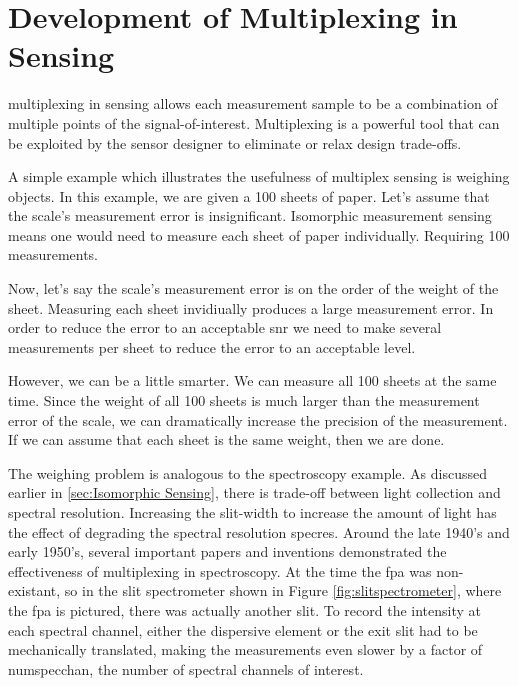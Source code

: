 \section{Development of Multiplexing in Sensing}

\Gls{multiplexing} in sensing allows each measurement sample to be a combination of multiple points of the signal-of-interest. Multiplexing is a powerful tool that can be exploited by the sensor designer to eliminate or relax design trade-offs. 

A simple example which illustrates the usefulness of multiplex sensing is weighing objects. In this example, we are given a 100 sheets of paper. Let's assume that the scale's measurement error is insignificant. Isomorphic measurement sensing means one would need to measure each sheet of paper individually. Requiring 100 measurements. 

Now, let's say the scale's measurement error is on the order of the weight of the sheet. Measuring each sheet invidiually produces a large measurement error. In order to reduce the error to an acceptable \gls{snr} we need to make several measurements per sheet to reduce the error to an acceptable level.

However, we can be a little smarter. We can measure all 100 sheets at the same time. Since the weight of all 100 sheets is much larger than the measurement error of the scale, we can dramatically increase the precision of the measurement. If we can assume that each sheet is the same weight, then we are done. 

The weighing problem is analogous to the spectroscopy example. As discussed earlier in \autoref{sec:Isomorphic Sensing}, there is trade-off between light collection and spectral resolution. Increasing the slit-width to increase the amount of light has the effect of degrading the spectral resolution \gls{specres}. Around the late 1940's and early 1950's, several important papers and inventions demonstrated the effectiveness of multiplexing in spectroscopy. At the time the \gls{fpa} was non-existant, so in the slit spectrometer shown in Figure \ref{fig:slitspectrometer}, where the \gls{fpa} is pictured, there was actually another slit. To record the intensity at each spectral channel, either the dispersive element or the exit slit had to be mechanically translated, making the measurements even slower by a factor of \gls{numspecchan}, the number of spectral channels of interest. 


